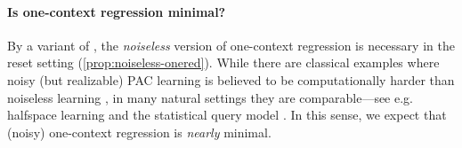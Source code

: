 \paragraph{Is one-context regression minimal?} %
By a variant of \cite[Proposition B.2]{golowich2024exploration}, the \emph{noiseless} version of one-context regression is necessary in the reset setting (\cref{prop:noiseless-onered}). While there are classical examples where noisy (but realizable) PAC learning is believed to be computationally harder than noiseless learning \citep{blum2003noise}, in many natural settings they are comparable---see e.g. halfspace learning \citep{blum1998polynomial,diakonikolas2023strongly} and the statistical query model \citep{kearns1998efficient}. In this sense, we expect that (noisy) one-context regression is \emph{nearly} minimal.\loose





\iffalse
\begin{theorem}\label{cor:reset-rl-to-regression}
There is a constant $C_{\ref{cor:reset-rl-to-regression}}>0$ so that the following holds. Suppose that $\Reg$ is an $\Nreg$-efficient one-context regression algorithm for $\Phi$. Then $\PCR(\Reg,\cdot,\cdot,N)$ with $N:=\Nreg\left(\left(\frac{\epsilon\delta}{H|\MA||\MS|}\right)^{C_{\ref{cor:reset-rl-to-regression}}},\left(\frac{\epsilon\delta}{H|\MA||\MS|}\right)^{C_{\ref{cor:reset-rl-to-regression}}}\right)$ is an $(\Nrl,\Krl)$-efficient strong reward-free RL-with-resets algorithm for $\Phi$ with:
\begin{itemize}
    \item $\Krl(\epsilon,\delta,H,|\MA|) \leq H^2|\MS|^2$
    \item $\Nrl(\epsilon,\delta,H,|\MA|) \leq \left(\frac{H|\MA||\MS|}{\epsilon\delta}\right)^{C_{\ref{cor:reset-rl-to-regression}}} \Nreg\left(\left(\frac{\epsilon\delta}{H|\MA||\MS|}\right)^{C_{\ref{cor:reset-rl-to-regression}}},\left(\frac{\epsilon\delta}{H|\MA||\MS|}\right)^{C_{\ref{cor:reset-rl-to-regression}}}\right)$.
\end{itemize}
Moreover, the time complexity of $\PCR$ is $\poly(N,H,|\MS|,|\MA|,\epsilon^{-1},\delta^{-1})$.
\end{theorem}
\fi
